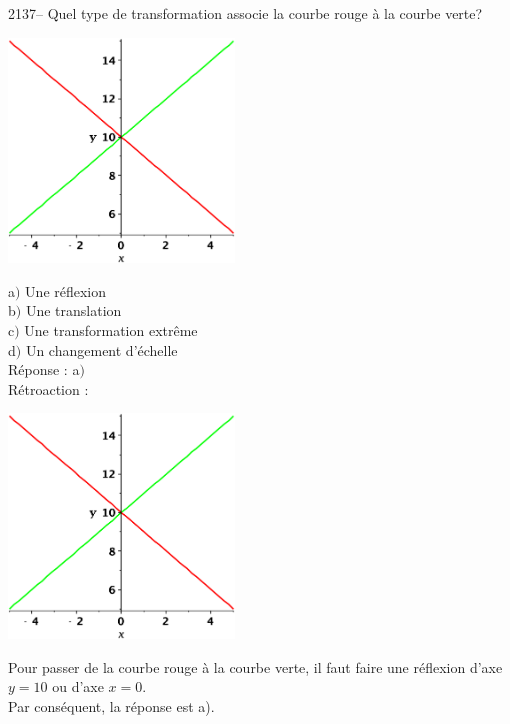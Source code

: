 \documentclass[letterpaper, 12pt]{article}
\begin{document}
2137-- Quel type de transformation associe la courbe rouge \`a la courbe verte?
\begin{center}
 \includegraphics[width=6cm,bb=20 118 575 673]{Q2137.eps}
\end{center}

a$)$ Une r\'eflexion\\
b$)$ Une translation\\
c$)$ Une transformation extr\^eme\\
d$)$ Un changement d'\'echelle\\

R\'eponse : a$)$\\

R\'etroaction :
\begin{center}
 \includegraphics[width=6cm,bb=20 118 575 673]{Q2137.eps}
\end{center}
Pour passer de la courbe rouge \`a la courbe verte, il faut faire une r\'eflexion d'axe $y=10$ ou d'axe $x=0$. \\
Par cons\'equent, la r\'eponse est a).\\
\end{document}
